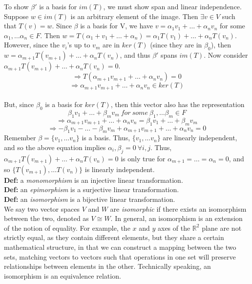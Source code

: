 \documentclass[12pt]{article}
\begin{document}
To show $\beta'$ is a basis for $im(T)$, we must show span and linear independence. Suppose $w \in im(T)$ is an arbitrary element of the image. Then $\exists v \in V$ such that $T(v) = w$. Since $\beta$ is a basis for V, we have $v = \alpha_1 v_1 + \dots + \alpha_n v_n$ for some $\alpha_1, \dots \alpha_n \in F$. Then $w = T(\alpha_1 + v_1 + \dots + \alpha_n) = \alpha_1 T(v_1) + \dots + \alpha_n T(v_n)$. However, since the $v_i$'s up to $v_m$ are in $ker(T)$ (since they are in $\beta_0$), then $w = \alpha_{m + 1} T(v_{m + 1}) + \dots + \alpha_n T(v_n)$, and thus $\beta'$ spans $im(T)$. Now consider $\alpha_{m + 1} T(v_{m + 1}) + \dots + \alpha_n T(v_n) = 0$.
$$\Rightarrow T(\alpha_{m + 1} v_{m + 1} + \dots + \alpha_n v_n) = 0$$
$$\Rightarrow \alpha_{m + 1} v_{m + 1} + \dots + \alpha_n v_n \in ker(T)$$\\
But, since $\beta_0$ is a basis for $ker(T)$, then this vector also has the representation 
$$\beta_1 v_1 + \dots + \beta_m v_m\ for\ some\ \beta_1, \dots \beta_m \in F$$
$$\Rightarrow \alpha_{m + 1} v_{m + 1} + \dots + \alpha_n v_n = \beta_1 v_1 + \dots + \beta_m v_m$$
$$\Rightarrow -\beta_1 v_1 - \dots - \beta_m v_m + \alpha_{m + 1} v_{m + 1} + \dots + \alpha_n v_n = 0$$
Remember $\beta = \{ v_1, \dots v_n \}$ is a basis. Thus, $\{ v_1, \dots v_n\}$ are linearly independent, and so the above equation implies $\alpha_i, \beta_j = 0\ \forall i, j$. Thus, $\alpha_{m + 1} T(v_{m + 1} ) + \dots + \alpha_n T(v_n) = 0$ is only true for $\alpha_{m + 1} = \dots = \alpha_n = 0$, and so $\{ T(v_{m + 1}), \dots T(v_n) \}$ is linearly independent.\\

\textbf{Def: }a \emph{monomorphism} is an injective linear transformation.\\

\textbf{Def: }an \emph{epimorphism} is a surjective linear transformation.\\

\textbf{Def: }an \emph{isomorphism} is a bijective linear transformation.\\

We say two vector spaces $V$ and $W$ are \emph{isomorphic} if there exists an isomorphism between the two, denoted as $V \cong W$. In general, an isomorphism is an extension of the notion of equality. For example, the $x$ and $y$ axes of the $\mathbb{R}^2$ plane are not strictly equal, as they contain different elements, but they share a certain mathematical structure, in that we can construct a mapping between the two sets, matching vectors to vectors such that operations in one set will preserve relationships between elements in the other. Technically speaking, an isomorphism is an equivalence relation.\\
\end{document}
